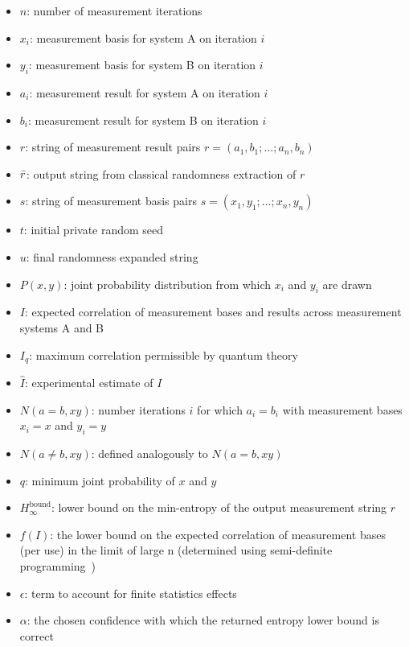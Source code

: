 \documentclass[12pt,letterpaper]{article}
\begin{document}
\begin{itemize}[noitemsep]
    \item $n$: number of measurement iterations
    \item $x_i$: measurement basis for system A on iteration $i$
    \item $y_i$: measurement basis for system B on iteration $i$
    \item $a_i$: measurement result for system A on iteration $i$
    \item $b_i$: measurement result for system B on iteration $i$
    \item $r$: string of measurement result pairs $r=(a_1,b_1;\ldots;a_n,b_n)$
    \item $\Bar{r}$: output string from classical randomness extraction of $r$
    \item $s$: string of measurement basis pairs $s=(x_1,y_1;\ldots;x_n,y_n)$
    \item $t$: initial private random seed
    \item $u$: final randomness expanded string
    \item $P(x,y)$: joint probability distribution from which $x_i$ and $y_i$ are drawn
    \item $I$: expected correlation of measurement bases and results across measurement systems A and B
    \item $I_q$: maximum correlation permissible by quantum theory
    \item $\hat{I}$: experimental estimate of $I$
    \item $N(a=b,xy)$: number iterations $i$ for which $a_i=b_i$ with measurement bases $x_i=x$ and $y_i=y$
    \item $N(a\neq b,xy)$: defined analogously to $N(a=b,xy)$
    \item $q$: minimum joint probability of $x$ and $y$
    \item $H_\infty^\textrm{bound}$: lower bound on the min-entropy of the output measurement string $r$
    \item $f(I)$: the lower bound on the expected correlation of measurement bases (per use) in the limit of large n (determined using semi-definite programming~\cite{pironio2010random})
    \item $\epsilon$: term to account for finite statistics effects
    \item $\alpha$: the chosen confidence with which the returned entropy lower bound is correct
\end{itemize}
\end{document}
